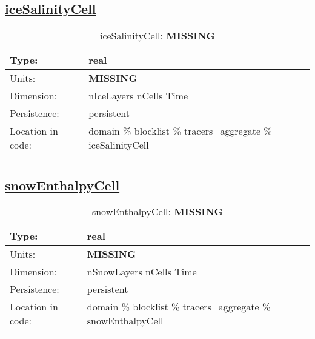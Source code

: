 \subsection[iceSalinityCell]{\hyperref[sec:var_tab_tracers_aggregate]{iceSalinityCell}}
\label{subsec:var_sec_tracers_aggregate_iceSalinityCell}
\begin{center}
\begin{longtable}{| p{2.0in} | p{4.0in} |}
        \hline 
        Type: & real \\
        \hline 
        Units: & {\bf \color{red} MISSING} \\
        \hline 
        Dimension: & nIceLayers nCells Time \\
        \hline 
        Persistence: & persistent \\
        \hline 
         Location in code: & domain \% blocklist \% tracers\_aggregate \% iceSalinityCell \\
         \hline 
    \caption{iceSalinityCell: {\bf \color{red} MISSING}}
\end{longtable}
\end{center}
\subsection[snowEnthalpyCell]{\hyperref[sec:var_tab_tracers_aggregate]{snowEnthalpyCell}}
\label{subsec:var_sec_tracers_aggregate_snowEnthalpyCell}
\begin{center}
\begin{longtable}{| p{2.0in} | p{4.0in} |}
        \hline 
        Type: & real \\
        \hline 
        Units: & {\bf \color{red} MISSING} \\
        \hline 
        Dimension: & nSnowLayers nCells Time \\
        \hline 
        Persistence: & persistent \\
        \hline 
         Location in code: & domain \% blocklist \% tracers\_aggregate \% snowEnthalpyCell \\
         \hline 
    \caption{snowEnthalpyCell: {\bf \color{red} MISSING}}
\end{longtable}
\end{center}
